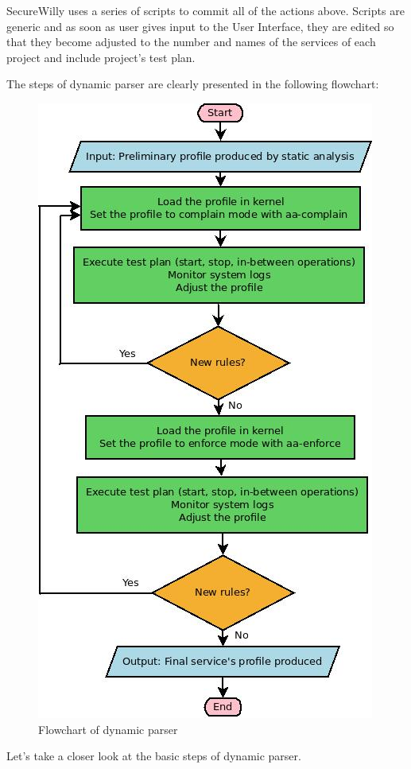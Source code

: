 SecureWilly uses a series of scripts to commit all of the actions above. Scripts are generic and as soon as user gives input to the User Interface, they are edited so that they become adjusted to the number and names of the services of each project and include project's test plan.

The steps of dynamic parser are clearly presented in the following flowchart:

\hfill\break\hfill\break\hfill\break\hfill\break\hfill\break

\begin{figure}[hp!]
  \centering
   \includegraphics[width=0.8\linewidth]{./figures/DynamicAlgo.jpeg}
   \caption{Flowchart of dynamic parser}
\end{figure}

Let's take a closer look at the basic steps of dynamic parser.

